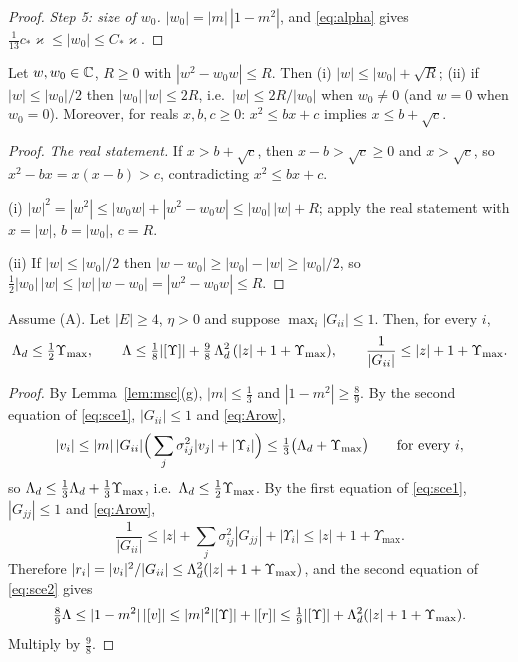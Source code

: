 \begin{proof}
\emph{Step 5: size of $w_0$.} $|w_0|=|m|\,|1-m^2|$, and \eqref{eq:alpha} gives $\frac1{13}c_*\varkappa\le|w_0|\le C_*\varkappa$.
\end{proof}

\begin{lemma}\label{lem:scalar}
Let $w,w_0\in\mathbb{C}$, $R\ge0$ with $|w^2-w_0w|\le R$. Then \textup{(i)} $|w|\le|w_0|+\sqrt R$; \textup{(ii)} if $|w|\le|w_0|/2$ then $|w_0|\,|w|\le2R$, i.e.\ $|w|\le2R/|w_0|$ when $w_0\ne0$ (and $w=0$ when $w_0=0$).
Moreover, for reals $x,b,c\ge0$: $x^2\le bx+c$ implies $x\le b+\sqrt c$.
\end{lemma}
\begin{proof}
\emph{The real statement.} If $x>b+\sqrt c$, then $x-b>\sqrt c\ge0$ and $x>\sqrt c$, so $x^2-bx=x(x-b)>c$, contradicting $x^2\le bx+c$.

(i) $|w|^2=|w^2|\le|w_0w|+|w^2-w_0w|\le|w_0|\,|w|+R$; apply the real statement with $x=|w|$, $b=|w_0|$, $c=R$.

(ii) If $|w|\le|w_0|/2$ then $|w-w_0|\ge|w_0|-|w|\ge|w_0|/2$, so $\frac12|w_0|\,|w|\le|w|\,|w-w_0|=|w^2-w_0w|\le R$.
\end{proof}

\begin{lemma}\label{lem:stabfar}
Assume \textup{(A)}. Let $|E|\ge4$, $\eta>0$ and suppose $\max_i|G_{ii}|\le1$. Then, for every $i$,
\[
 \Lambda_d\le\tfrac12\Upsilon_{\max},\qquad\Lambda\le\tfrac18|[\Upsilon]|+\tfrac98\,\Lambda_d^2\,(|z|+1+\Upsilon_{\max}),\qquad\frac1{|G_{ii}|}\le|z|+1+\Upsilon_{\max}.
\]
\end{lemma}
\begin{proof}
By Lemma~\ref{lem:msc}(g), $|m|\le\frac13$ and $|1-m^2|\ge\frac89$. By the second equation of \eqref{eq:sce1}, $|G_{ii}|\le1$ and \eqref{eq:Arow},
\[
 |v_i|\le|m|\,|G_{ii}|\Big(\sum_j\sigma_{ij}^2|v_j|+|\Upsilon_i|\Big)\le\tfrac13\big(\Lambda_d+\Upsilon_{\max}\big)\qquad\text{for every }i,
\]
so $\Lambda_d\le\frac13\Lambda_d+\frac13\Upsilon_{\max}$, i.e.\ $\Lambda_d\le\frac12\Upsilon_{\max}$. By the first equation of \eqref{eq:sce1}, $|G_{jj}|\le1$ and \eqref{eq:Arow},
\[
 \frac1{|G_{ii}|}\le|z|+\sum_j\sigma_{ij}^2|G_{jj}|+|\Upsilon_i|\le|z|+1+\Upsilon_{\max}.
\]
Therefore $|r_i|=|v_i|^2/|G_{ii}|\le\Lambda_d^2(|z|+1+\Upsilon_{\max})$, and the second equation of \eqref{eq:sce2} gives
\[
 \tfrac89\Lambda\le|1-m^2|\,|[v]|\le|m|^2|[\Upsilon]|+|[r]|\le\tfrac19|[\Upsilon]|+\Lambda_d^2(|z|+1+\Upsilon_{\max}).
\]
Multiply by $\frac98$.
\end{proof}

